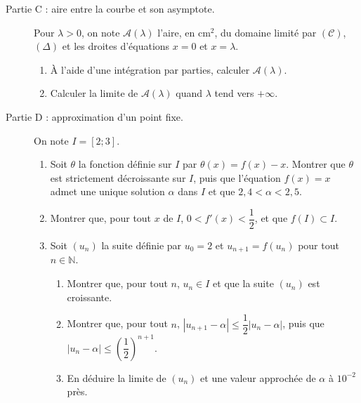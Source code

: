 \begin{exo}
\begin{description}
\begin{enumerate}
                  \end{enumerate}
            \item[Partie C : aire entre la courbe et son asymptote.]
                  Pour $\lambda > 0$, on note $\mathcal{A}(\lambda)$ l'aire, en $\text{cm}^2$, du domaine limit\'e par $(\mathscr{C})$,
                  $(\Delta)$ et les droites d'\'equations $x = 0$ et $x = \lambda$.
                  \begin{enumerate}
                        \item \`A l'aide d'une int\'egration par parties, calculer $\mathcal{A}(\lambda)$.
                        \item Calculer la limite de $\mathcal{A}(\lambda)$ quand $\lambda$ tend vers $+\infty$.
                  \end{enumerate}
            \item[Partie D : approximation d'un point fixe.]
                  On note $I = [2 ; 3]$.
                  \begin{enumerate}
                        \item Soit $\theta$ la fonction d\'efinie sur $I$ par $\theta(x) = f(x) - x$.
                              Montrer que $\theta$ est strictement d\'ecroissante sur $I$, puis que l'\'equation $f(x) = x$ admet
                              une unique solution $\alpha$ dans $I$ et que $2{,}4 < \alpha < 2{,}5$.
                        \item Montrer que, pour tout $x$ de $I$, $0 < f'(x) < \dfrac{1}{2}$, et que $f(I) \subset I$.
                        \item Soit $(u_n)$ la suite d\'efinie par $u_0 = 2$ et $u_{n+1} = f(u_n)$ pour tout $n \in \mathbb{N}$.
                              \begin{enumerate}
                                    \item Montrer que, pour tout $n$, $u_n \in I$ et que la suite $(u_n)$ est croissante.
                                    \item Montrer que, pour tout $n$, $\left| u_{n+1} - \alpha \right| \leq \dfrac{1}{2} \left| u_n - \alpha \right|$,
                                          puis que $\left| u_n - \alpha \right| \leq \left( \dfrac{1}{2} \right)^{n+1}$.
                                    \item En d\'eduire la limite de $(u_n)$ et une valeur approch\'ee de $\alpha$ \`a $10^{-2}$ pr\`es.
                              \end{enumerate}
                  \end{enumerate}
      \end{description}
\end{exo}
